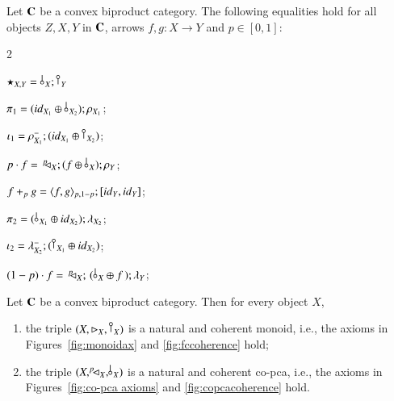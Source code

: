 \begin{lemma}\label{lemma:initialproperties}
Let $\mathbf{C}$ be a convex biproduct category. The following equalities hold for all objects $Z,X,Y$ in $\mathbf{C}$, arrows $f,g\colon X \to Y$ and $p\in [0,1]$:
\begin{enumerate}
\begin{multicols}{2}
\item[(1)] $\star_{X,Y} = \bang{X};\cobang{Y}$
\item[(3)]  $\pi_1=(\id{X_1}\oplus \bang{X_2});\runit{X_1}$;
\item[(5)]  $\iota_1=\Irunit{X_1}; (\id{X_1}\oplus \cobang{X_2})$;
\item[(7)] $p \cdot f =\, \diagp{X}; (f \oplus \bang{X} ) ; \runit{Y} $;
\item[(2)] $f+_p g = \langle f,g \rangle_{p,1-p};[{id}_{Y},{id}_{Y}]$;
\item[(4)] $\pi_2 =(\bang{X_1}\oplus \id{X_2});\lunit{X_2}$;
\item[(6)] $\iota_2 = \Ilunit{X_2} ;(\cobang{X_1}\oplus \id{X_2})$;
 \item[(8)] $(1-p)\cdot  f=\, \diagp{X} ;  \, (\bang{X}  \oplus f \,)  ; \lunit{Y}$; 
 \end{multicols}
\end{enumerate}
\end{lemma}
\begin{proposition}\label{lemma: copca objects in convbicat}
Let $\mathbf{C}$ be a convex biproduct category. Then for every object $X$,  
\begin{enumerate}
 \item the triple  $(X, \codiag{X}, \cobang{X})$ is a natural and coherent monoid, i.e., the axioms in Figures~\ref{fig:monoidax} and \ref{fig:fccoherence} hold;
\item the triple $(X,\diagp{X},\bangp{X})$ is a natural and coherent co-pca, i.e., the axioms in Figures~\ref{fig:co-pca axioms} and \ref{fig:copcacoherence} hold. %
 \end{enumerate}
\end{proposition}

